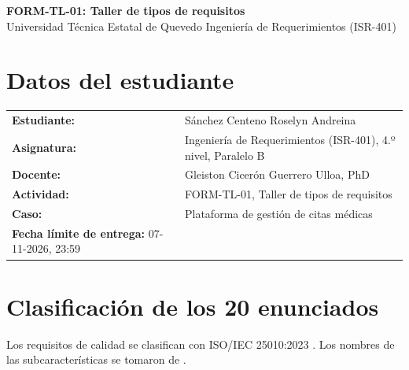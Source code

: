 \documentclass[11pt,a4paper]{article}
\begin{document}
\begin{center}
{\Large\bfseries FORM-TL-01: Taller de tipos de requisitos}\\[2pt]
Universidad Técnica Estatal de Quevedo \quad Ingeniería de Requerimientos (ISR-401)
\end{center}

\section{Datos del estudiante}
\begin{tabular}{@{}ll@{}}
\textbf{Estudiante:} & Sánchez Centeno Roselyn Andreina \\
\textbf{Asignatura:} & Ingeniería de Requerimientos (ISR-401), 4.º nivel, Paralelo B \\
\textbf{Docente:} & Gleiston Cicerón Guerrero Ulloa, PhD \\
\textbf{Actividad:} & FORM-TL-01, Taller de tipos de requisitos \\
\textbf{Caso:} & Plataforma de gestión de citas médicas \\
\textbf{Fecha límite de entrega:} 07-11-2026, 23:59\\
\end{tabular}

\section{Clasificación de los 20 enunciados}

Los requisitos de calidad se clasifican con ISO/IEC 25010:2023 \cite{iso25010}.
Los nombres de las subcaracterísticas se tomaron de \cite{q42}.
\end{document}
